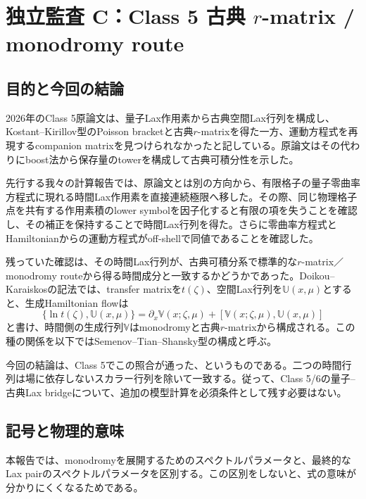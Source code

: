 \section{独立監査 C：Class 5 古典 $r$-matrix / monodromy route}
\subsection{目的と今回の結論}

2026年のClass 5原論文は、量子Lax作用素から古典空間Lax行列を構成し、Kostant--Kirillov型のPoisson bracketと古典$r$-matrixを得た一方、運動方程式を再現するcompanion matrixを見つけられなかったと記している\cite{DFN}。原論文はその代わりにboost法から保存量のtowerを構成して古典可積分性を示した。

先行する我々の計算報告では、原論文とは別の方向から、有限格子の量子零曲率方程式に現れる時間Lax作用素を直接連続極限へ移した。その際、同じ物理格子点を共有する作用素積のlower symbolを因子化すると有限の項を失うことを確認し、その補正を保持することで時間Lax行列を得た。さらに零曲率方程式とHamiltonianからの運動方程式がoff-shellで同値であることを確認した。

残っていた確認は、その時間Lax行列が、古典可積分系で標準的な$r$-matrix／monodromy routeから得る時間成分と一致するかどうかであった。Doikou--Karaiskosの記法では、transfer matrixを$t(\zeta)$、空間Lax行列を$\mathbb U(x,\mu)$とすると、生成Hamiltonian flowは
\begin{equation}
\{\ln t(\zeta),\mathbb U(x,\mu)\}
=
\partial_x\mathbb V(x;\zeta,\mu)
+[\mathbb V(x;\zeta,\mu),\mathbb U(x,\mu)]
\label{audit5r:eq:STSflow}
\end{equation}
と書け、時間側の生成行列$\mathbb V$はmonodromyと古典$r$-matrixから構成される\cite{DK}。この種の関係を以下ではSemenov--Tian--Shansky型の構成と呼ぶ。

今回の結論は、Class 5でこの照合が通った、というものである。二つの時間行列は場に依存しないスカラー行列を除いて一致する。従って、Class 5/6の量子--古典Lax bridgeについて、追加の模型計算を必須条件として残す必要はない。

\subsection{記号と物理的意味}

本報告では、monodromyを展開するためのスペクトルパラメータと、最終的なLax pairのスペクトルパラメータを区別する。この区別をしないと、式の意味が分かりにくくなるためである。

